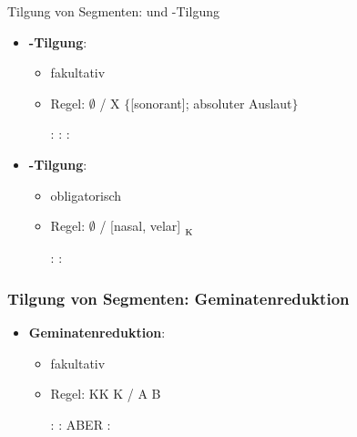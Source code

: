 \begin{frame}{Tilgung von Segmenten:  und -Tilgung}

\begin{itemize}
	\item \textbf{-Tilgung}:
	
	\begin{itemize}
		\item fakultativ
		\item Regel:  \ras $\emptyset$ / X \underline{\quad} $\{$[sonorant]; absoluter Auslaut$\}$
	
	\eal
		\ex {}:  \ras \textipa{[ge:n]}
		\ex {}:  \ras \textipa{[k\t{aU}f]}
		\ex {}:  \ras {}
	\zl
	
	\end{itemize}

	\item \textbf{-Tilgung}:
	
	\begin{itemize}
		\item obligatorisch
		\item Regel:  \ras $\emptyset$ / [nasal, velar] \underline{\quad}$_{\textsubscript{K}}$
		
		\ea {}:  \ras {}
		\ex {}:  \ras \textipa{[PaNst]}
		\z
		
	\end{itemize}
			
\end{itemize}

\end{frame}


\begin{frame}
\frametitle{Tilgung von Segmenten: Geminatenreduktion}

\begin{itemize}
	\item \textbf{Geminatenreduktion}:

	\begin{itemize}
		\item fakultativ
		\item Regel: KK \ras K / A \underline{\quad} B

	\eal
		\ex {}:  \ras {}
		\ex {}:  \ras {}
		\ex ABER :  \ras \textipa{[\t{ts}\alertblue{o:.Po:}.p5]}
	\zl
	
	\end{itemize}
	
\end{itemize}

\end{frame}



